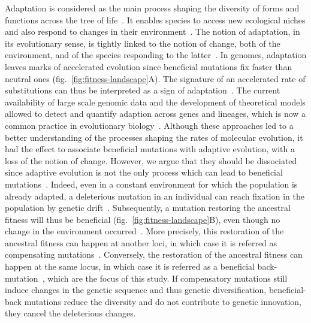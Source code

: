\documentclass{article}
\begin{document}
    Adaptation is considered as the main process shaping the diversity of forms and functions across the tree of life~\cite{darwin_origin_1859}.
    It enables species to access new ecological niches and also respond to changes in their environment~\cite{darwin_origin_1859}.
    The notion of adaptation, in its evolutionary sense, is tightly linked to the notion of change, both of the environment, and of the species responding to the latter~\cite{merrell_adaptive_1994}.
    In genomes, adaptation leaves marks of accelerated evolution since beneficial mutations fix faster than neutral ones (fig.~\ref{fig:fitness-landscape}A).
    The signature of an accelerated rate of substitutions can thus be interpreted as a sign of adaptation~\cite{mcdonald_adaptative_1991, smith_adaptive_2002a, welch_estimating_2006}.
    The current availability of large scale genomic data and the development of theoretical models allowed to detect and quantify adaption across genes and lineages, which is now a common practice in evolutionary biology~\cite{yang_statistical_2000, eyre-walker_genomic_2006, moutinho_variation_2019}.
    Although these approaches led to a better understanding of the processes shaping the rates of molecular evolution, it had the effect to associate beneficial mutations with adaptive evolution, with a loss of the notion of change.
    However, we argue that they should be dissociated since adaptive evolution is not the only process which can lead to beneficial mutations~\cite{charlesworth_other_2007, mustonen_fitness_2009}.
    Indeed, even in a constant environment for which the population is already adapted, a deleterious mutation in an individual can reach fixation in the population by genetic drift~\cite{Ohta1992}.
    Subsequently, a mutation restoring the ancestral fitness will thus be beneficial (fig.~\ref{fig:fitness-landscape}B), even though no change in the environment occurred~\cite{hartl_compensatory_1996, sella_application_2005, mustonen_fitness_2009, cvijovic_fate_2015}.
    More precisely, this restoration of the ancestral fitness can happen at another loci, in which case it is referred as compensating mutations~\cite{hartl_compensatory_1996, mustonen_fitness_2009}.
    Conversely, the restoration of the ancestral fitness can happen at the same locus, in which case it is referred as a beneficial back-mutation~\cite{piganeau_estimating_2003, charlesworth_other_2007}, which are the focus of this study.
    If compensatory mutations still induce changes in the genetic sequence and thus genetic diversification, beneficial-back mutations reduce the diversity and do not contribute to genetic innovation, they cancel the deleterious changes.
\end{document}
